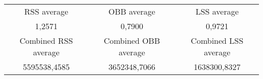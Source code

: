\begin{tabular}{c|c|c}\\ 
RSS average & OBB average & LSS average\\ 
1,2571 & 0,7900 & 0,9721\\ 
\hline 
Combined RSS average & Combined OBB average & Combined LSS average\\ 
5595538,4585 & 3652348,7066 & 1638300,8327\\ 
\end{tabular}